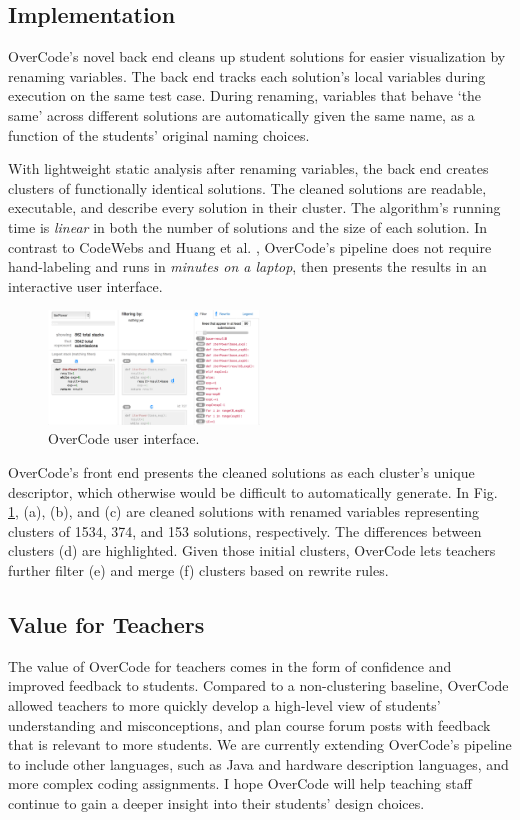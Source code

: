 \documentclass{sigchi}
\begin{document}
\subsection{Implementation}
OverCode's novel back end cleans up student solutions for easier visualization by renaming variables. The back end tracks each solution's local variables during execution on the same test case. During renaming, variables that behave `the same' across different solutions are automatically given the same name, as a function of the students' original naming choices. 

With lightweight static analysis after renaming variables, the back end creates clusters of functionally identical solutions. The cleaned solutions are readable, executable, and describe every solution in their cluster. The algorithm's running time is \emph{linear} in both the number of solutions and the size of each solution. In contrast to CodeWebs \cite{codewebs} and Huang et al. \citeyear{MOOCshop}, OverCode's pipeline does not require hand-labeling and runs in \emph{minutes on a laptop}, then presents the results in an interactive user interface.

\begin{figure}[h!]
\centering
\includegraphics[width=0.5\textwidth]{frontPageInterfacePreviewLabeled.jpg}
\caption{OverCode user interface.}
\label{fig:figure1}
\end{figure}

OverCode's front end presents the cleaned solutions as each cluster's unique descriptor, which otherwise would be difficult to automatically generate. In Fig. \ref{fig:figure1}, (a), (b), and (c) are cleaned solutions with renamed variables representing clusters of 1534, 374, and 153 solutions, respectively. The differences between clusters (d) are highlighted. Given those initial clusters, OverCode lets teachers further filter (e) and merge (f) clusters based on rewrite rules.

\subsection{Value for Teachers}
The value of OverCode for teachers comes in the form of confidence and improved feedback to students. Compared to a non-clustering baseline, OverCode allowed teachers to more quickly develop a high-level view of students' understanding and misconceptions, and plan course forum posts with feedback that is relevant to more students. We are currently extending OverCode's pipeline to include other languages, such as Java and hardware description languages, and more complex coding assignments. I hope OverCode will help teaching staff continue to gain a deeper insight into their students' design choices.
\end{document}

